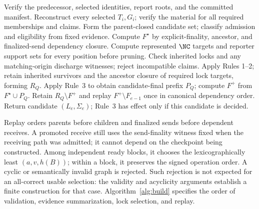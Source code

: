 \begin{algorithm}[t]
\caption{\texorpdfstring{$\Build(S_{e-1},Q,\mathcal M)$}{BuildState}}
\label{alg:build}
\begin{algorithmic}[1]
\State Verify the predecessor, selected identities, report roots, and the committed manifest.
\State Reconstruct every selected $T_i,G_i$; verify the material for all required memberships and claims.
\State Form the parent-closed candidate set; classify admission and eligibility from fixed evidence.
\State Compute $F^\star$ by explicit-finality, ancestor, and finalized-send dependency closure.
\State Compute represented $\NC$ targets and reporter support sets for every position before pruning.
\State Check inherited locks and any matching-origin discharge witnesses; reject incompatible claims.
\State Apply Rules 1--2; retain inherited survivors and the ancestor closure of required lock targets, forming $R_Q$.
\State Apply Rule~3 to obtain candidate-final prefix $P_Q$; compute $F^+$ from $F^\star\cup P_Q$.
\State Retain $R_Q\setminus F^+$ and replay $F^+\setminus F_{e-1}$ once in canonical dependency order.
\State Return candidate $(L_e,\Sigma_e)$; Rule~3 has effect only if this candidate is decided.
\end{algorithmic}
\end{algorithm}

Replay orders parents before children and finalized sends before dependent receives. A promoted receive still uses the send-finality witness fixed when the receiving path was admitted; it cannot depend on the checkpoint being constructed. Among independent ready blocks, it chooses the lexicographically least $(a,v,h(B))$; within a block, it preserves the signed operation order. A cyclic or semantically invalid graph is rejected. Such rejection is not expected for an all-correct usable selection: the validity and acyclicity arguments establish a finite construction for that case. Algorithm~\ref{alg:build} specifies the order of validation, evidence summarization, lock selection, and replay.
